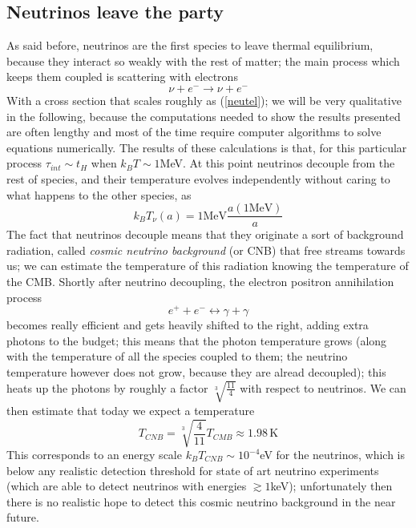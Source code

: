 \subsection{Neutrinos leave the party}
As said before, neutrinos are the first species to leave thermal equilibrium, because they interact so weakly with the rest of matter; the main process which keeps them coupled is scattering with electrons
\begin{equation}
\nu + e^- \rightarrow \nu + e^-
\end{equation}
With a cross section that scales roughly as (\ref{neutel}); we will be very qualitative in the following, because the computations needed to show the results presented are often lengthy and most of the time require computer algorithms to solve equations numerically. The results of these calculations is that, for this particular process $\tau_{int}\sim t_H$ when $k_BT\sim 1$MeV. At this point neutrinos decouple from the rest of species, and their temperature evolves independently without caring to what happens to the other species, as
\begin{equation}
k_BT_\nu(a)=1\mathrm{MeV}\frac{a(1\mathrm{MeV})}{a}
\end{equation}
The fact that neutrinos decouple means that they originate a sort of background radiation, called \textit{cosmic neutrino background} (or CNB) that free streams towards us; we can estimate the temperature of this radiation knowing the temperature of the CMB. Shortly after  neutrino decoupling, the electron positron annihilation process
\begin{equation}
e^+ + e^- \leftrightarrow \gamma+ \gamma
\end{equation}
becomes really efficient and gets heavily shifted to the right, adding extra photons to the budget; this means that the photon temperature grows (along with the temperature of all the species coupled to them; the neutrino temperature however does not grow, because they are alread decoupled); this heats up the photons by roughly a factor $\sqrt[3]{\frac{11}{4}}$ with respect to neutrinos. We can then estimate that today we expect a temperature
\begin{equation}
T_{CNB}=\sqrt[3]{\frac{4}{11}}T_{CMB}\approx 1.98\,\mathrm{K}
\end{equation}
This corresponds to an energy scale $k_BT_{CNB}\sim 10^{-4}$eV for the neutrinos, which is below any realistic detection threshold for state of art neutrino experiments (which are able to detect neutrinos with energies $\gtrsim 1$keV); unfortunately then there is no realistic hope to detect this cosmic neutrino background in the near future. 
